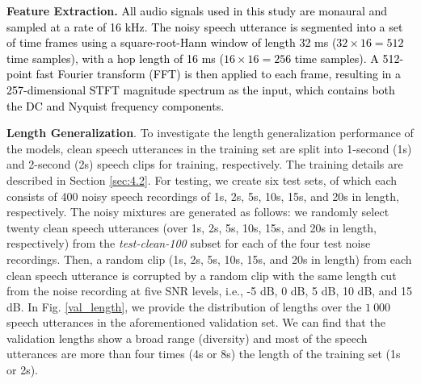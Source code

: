 \documentclass[journal]{IEEEtran}
\begin{document}
\textbf{Feature Extraction.} \textcolor{black}{All audio signals used in this study are monaural and sampled at a rate of 16 kHz. The noisy speech utterance is segmented into a set of time frames using a square-root-Hann window of length 32 ms ($32\!\times\!16\!=\!512$ time samples), with a hop length of 16 ms ($16\!\times\!16\!=\!256$ time samples). A 512-point fast Fourier transform (FFT) is then applied to each frame, resulting in a 257-dimensional STFT magnitude spectrum as the input, which contains both the DC and Nyquist frequency components.}


\textbf{Length Generalization}. To investigate the length generalization performance of the models, clean speech utterances in the training set are split into 1-second (1s) and 2-second (2s) speech clips for training, respectively. The training details are described in Section \ref{sec:4.2}. For testing, we create six test sets, of which each consists of 400 noisy speech recordings of 1s, 2s, 5s, 10s, 15s, and 20s in length, respectively. The noisy mixtures are generated as follows: we randomly select twenty clean speech utterances (over 1s, 2s, 5s, 10s, 15s, and 20s in length, respectively) from the \textit{test-clean-100} subset for each of the four test noise recordings. Then, a random clip (1s, 2s, 5s, 10s, 15s, and 20s in length) from each clean speech utterance is corrupted by a random clip with the same length cut from the noise recording at five SNR levels, i.e., -5 dB, 0 dB, 5 dB, 10 dB, and 15 dB. In Fig. \ref{val_length}, we provide the distribution of lengths over the $1\ 000$ speech utterances in the aforementioned validation set. We can find that the validation lengths show a broad range (diversity) and most of the speech utterances are more than four times (4s or 8s) the length of the training set (1s or 2s).


\end{document}

